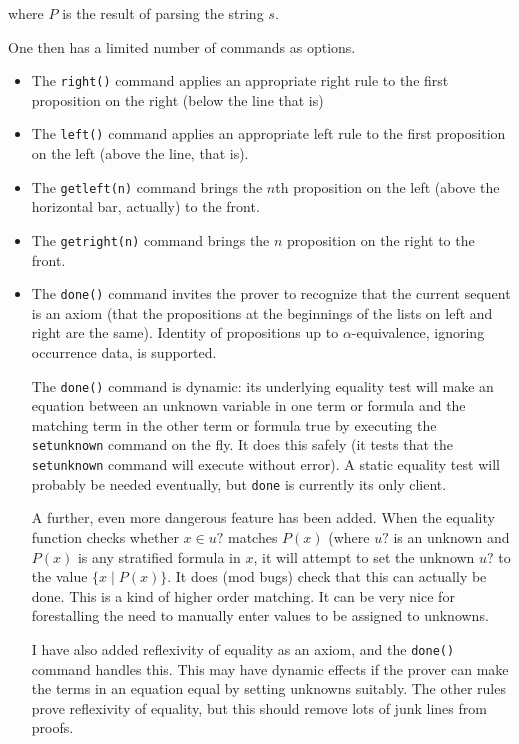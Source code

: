 \documentclass[12pt]{article}
\begin{document}
where $P$ is the result of parsing the string $s$.

One then has a limited number of commands as options.

\begin{itemize}

\item The {\tt right()} command applies an appropriate right rule to the first proposition on the right (below the line that is)

\item The {\tt left()} command applies an appropriate left rule to the first proposition on the left (above the line, that is).

\item  The {\tt getleft(n)} command brings the $n$th proposition on the left (above the horizontal bar, actually) to the front.

\item The {\tt getright(n)} command brings the $n$ proposition on the right to the front.

\item The {\tt done()} command invites the prover to recognize that the current sequent is an axiom (that the propositions at the beginnings of the lists on left and right are the same).  Identity of propositions up to $\alpha$-equivalence, ignoring occurrence data, is supported.

The {\tt done()} command is dynamic:  its underlying equality test will make an equation between an unknown variable in one term or formula and the matching term in the other term or formula true by executing the {\tt setunknown} command on the fly.  It does this safely (it tests that the
{\tt setunknown} command will execute without error).  A static equality test will probably be needed eventually, but {\tt done} is currently its only client.

A further, even more dangerous feature has been added.  When the equality function checks whether $x \in u?$ matches $P(x)$
(where $u?$ is an unknown and $P(x)$ is any stratified formula in $x$, it will attempt to set the unknown $u?$ to the value $\{x\mid P(x)\}$.  It does (mod bugs) check that this can actually be done.
This is a kind of higher order matching.  It can be very nice for forestalling the need to manually enter values to be assigned to unknowns.

I have also added reflexivity of equality as an axiom, and the {\tt done()} command handles this.  This may have dynamic effects
if the prover can make the terms in an equation equal by setting unknowns suitably.  The other rules prove reflexivity of equality, but this
should remove lots of junk lines from proofs.


\end{itemize}
\end{document}
